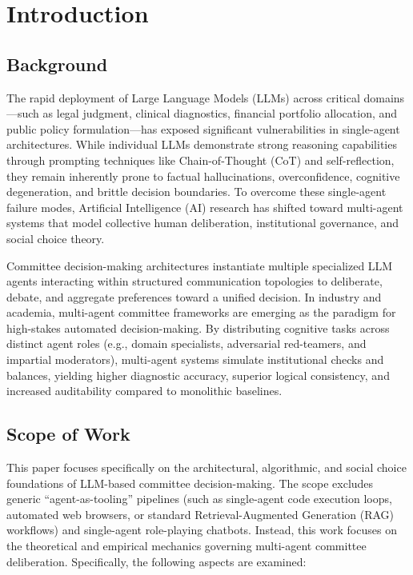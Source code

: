 \documentclass[a4paper,fleqn]{cas-sc}
\begin{document}
\section{Introduction}

\subsection{Background}

The rapid deployment of Large Language Models (LLMs) across critical domains---such as legal judgment, clinical diagnostics, financial portfolio allocation, and public policy formulation---has exposed significant vulnerabilities in single-agent architectures. While individual LLMs demonstrate strong reasoning capabilities through prompting techniques like Chain-of-Thought (CoT) and self-reflection, they remain inherently prone to factual hallucinations, overconfidence, cognitive degeneration, and brittle decision boundaries. To overcome these single-agent failure modes, Artificial Intelligence (AI) research has shifted toward multi-agent systems that model collective human deliberation, institutional governance, and social choice theory.

Committee decision-making architectures instantiate multiple specialized LLM agents interacting within structured communication topologies to deliberate, debate, and aggregate preferences toward a unified decision. In industry and academia, multi-agent committee frameworks are emerging as the paradigm for high-stakes automated decision-making. By distributing cognitive tasks across distinct agent roles (e.g., domain specialists, adversarial red-teamers, and impartial moderators), multi-agent systems simulate institutional checks and balances, yielding higher diagnostic accuracy, superior logical consistency, and increased auditability compared to monolithic baselines.

\subsection{Scope of Work}

This paper focuses specifically on the architectural, algorithmic, and social choice foundations of LLM-based committee decision-making. The scope excludes generic ``agent-as-tooling'' pipelines (such as single-agent code execution loops, automated web browsers, or standard Retrieval-Augmented Generation (RAG) workflows) and single-agent role-playing chatbots. Instead, this work focuses on the theoretical and empirical mechanics governing multi-agent committee deliberation. Specifically, the following aspects are examined:
\end{document}
